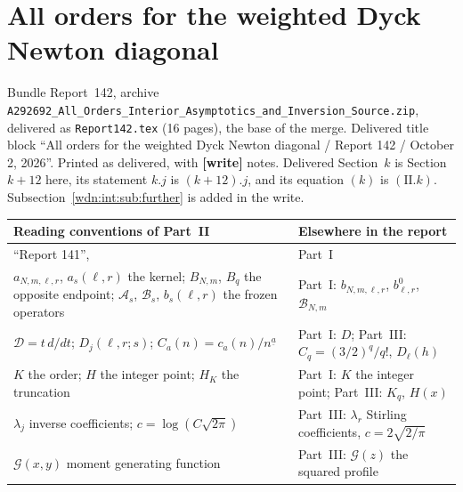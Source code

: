 \documentclass[11pt,letterpaper]{article}
\theoremstyle{remark}\newtheorem{remark}[theorem]{Remark}
\newcommand{\fall}[2]{#1^{\underline{#2}}}
\newcommand{\dd}{\mathcal D}
\newcommand{\file}[1]{\nolinkurl{#1}}
\newcommand{\partsource}[1]{\par\noindent\begin{minipage}{\textwidth}\small #1\end{minipage}\par\medskip}
\newcommand{\parteqs}[1]{\setcounter{equation}{0}%
 \renewcommand{\theequation}{#1\arabic{equation}}%
 \renewcommand{\theHequation}{#1\arabic{equation}}}
\begin{document}
\part{All orders for the weighted Dyck Newton diagonal}\label{wdn:int:part}
\parteqs{II.}
\partsource{Bundle Report~142, archive \file{A292692_All_Orders_Interior_Asymptotics_and_Inversion_Source.zip}, delivered as \file{Report142.tex} (16 pages), the base of the merge. Delivered title block ``All orders for the weighted Dyck Newton diagonal / Report 142 / October 2, 2026''. Printed as delivered, with \textbf{[write]} notes. Delivered Section~$k$ is Section~$k+12$ here, its statement $k.j$ is $(k+12).j$, and its equation $(k)$ is $(\mathrm{II}.k)$. Subsection~\ref{wdn:int:sub:further} is added in the write.}
\begin{center}
\small
\begin{tabular}{@{}>{\raggedright\arraybackslash}p{} >{\raggedright\arraybackslash}p{}@{}}
\toprule
Reading conventions of Part~II & Elsewhere in the report\\
\midrule
``Report 141'', \cite{foundation} & Part~I\\
$a_{N,m,\ell,r}$, $a_s(\ell,r)$ the kernel; $B_{N,m}$, $B_q$ the opposite endpoint; $\mathcal A_s$, $\mathcal B_s$, $b_s(\ell,r)$ the frozen operators & Part~I: $b_{N,m,\ell,r}$, $b^0_{\ell,r}$, $\mathcal B_{N,m}$\\
$\dd=t\,d/dt$; $D_j(\ell,r;s)$; $C_a(n)=c_a(n)/\fall na$ & Part~I: $D$; Part~III: $C_q=(3/2)^q/q!$, $D_\ell(h)$\\
$K$ the order; $H$ the integer point; $H_K$ the truncation & Part~I: $K$ the integer point; Part~III: $K_q$, $H(x)$\\
$\lambda_j$ inverse coefficients; $c=\log(C\sqrt{2\pi})$ & Part~III: $\lambda_r$ Stirling coefficients, $c=2\sqrt{2/\pi}$\\
$\mathcal G(x,y)$ moment generating function & Part~III: $\mathcal G(z)$ the squared profile\\
\bottomrule
\end{tabular}
\end{center}
\end{document}

